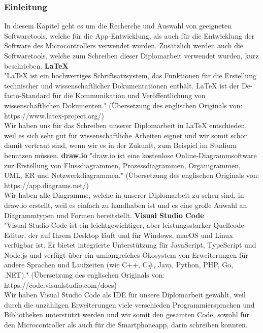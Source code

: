 \documentclass[]{article}
\begin{document}
\subsubsection{Einleitung}
In diesem Kapitel geht es um die Recherche und Auswahl von geeigneten Softwaretools, welche für die App-Entwicklung, als auch für die Entwicklung der Software des Microcontrollers verwendet wurden. Zusätzlich werden auch die Softwaretools, welche zum Schreiben dieser Diplomarbeit verwendet wurden, kurz beschrieben. 
\vspace{4mm}\newline
\textbf{LaTeX} \\
"LaTeX ist ein hochwertiges Schriftsatzsystem, das Funktionen für die Erstellung technischer und wissenschaftlicher Dokumentationen enthält. LaTeX ist der De-facto-Standard für die Kommunikation und Veröffentlichung von wissenschaftlichen Dokumenten." (Übersetzung des englischen Originals von: https://www.latex-project.org/) \\
Wir haben uns für das Schreiben unserer Diplomarbeit in LaTeX entschieden, weil es sich sehr gut für wissenschaftliche Arbeiten eignet und wir somit schon damit vertraut sind, wenn wir es in der Zukunft, zum Beispiel im Studium benutzen müssen.
\vspace{4mm}\newline
\textbf{draw.io}
"draw.io ist eine kostenlose Online-Diagrammsoftware zur Erstellung von Flussdiagrammen, Prozessdiagrammen, Organigrammen, UML, ER und Netzwerkdiagrammen." (Übersetzung des englischen Originals von: https://app.diagrams.net/) \\
Wir haben alle Diagramme, welche in unserer Diplomarbeit zu sehen sind, in draw.io erstellt, weil es einfach zu handhaben ist und es eine große Auwahl an Diagrammtypen und Formen bereitstellt.
\vspace{4mm}\newline
\textbf{Visual Studio Code} \\
"Visual Studio Code ist ein leichtgewichtiger, aber leistungsstarker Quellcode-Editor, der auf Ihrem Desktop läuft und für Windows, macOS und Linux verfügbar ist. Er bietet integrierte Unterstützung für JavaScript, TypeScript und Node.js und verfügt über ein umfangreiches Ökosystem von Erweiterungen für andere Sprachen und Laufzeiten (wie C++, C\#, Java, Python, PHP, Go, .NET)." (Übersetzung des englischen Originals von: https://code.visualstudio.com/docs) \\
Wir haben Visual Studio Code als IDE für unsere Diplomarbeit gewählt, weil durch die unzähligen Erweiterungen viele verschieden Programmiersprachen und Bibliotheken unterstützt werden und wir somit den gesamten Code, sowohl für den Microcontroller als auch für die Smartphoneapp, darin schreiben konnten.
\end{document}
